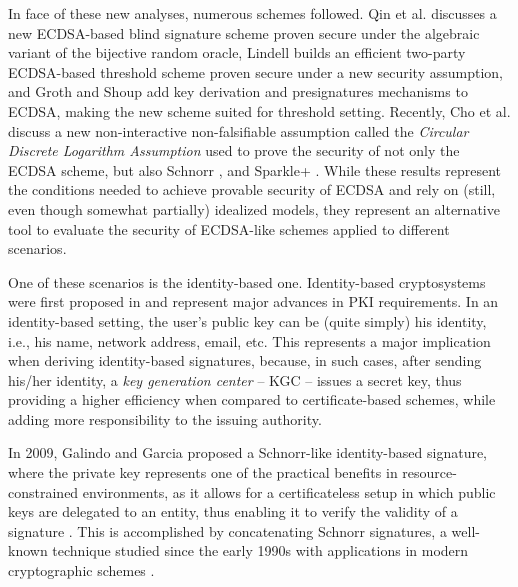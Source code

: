 \documentclass[version=submission, floatrow]{iacrcc}
\begin{document}
In face of these new analyses, numerous schemes followed.
%
Qin et al. \cite{Qin2021} discusses a new ECDSA-based blind signature scheme proven secure under the algebraic variant of the bijective random oracle, Lindell \cite{Lindell2021} builds an efficient two-party ECDSA-based threshold scheme proven secure under a new security assumption, and Groth and Shoup \cite{Groth2022} add key derivation and presignatures mechanisms to ECDSA, making the new scheme suited for threshold setting.
%
Recently, Cho et al. \cite{Fuchsbauer2025} discuss a new non-interactive non-falsifiable assumption called the \emph{Circular Discrete Logarithm Assumption} used to prove the security of not only the ECDSA scheme, but also Schnorr \cite{Schnorr1989}, and \textsf{Sparkle+} \cite{Crites2023}.
%
While these results represent the conditions needed to achieve provable security of ECDSA and rely on (still, even though somewhat partially) idealized models, they represent an alternative tool to evaluate the security of ECDSA-like schemes applied to different scenarios.

One of these scenarios is the identity-based one. Identity-based cryptosystems were first proposed in \cite{Shamir1985} and represent major advances in PKI requirements. 
%
In an identity-based setting, the user's public key can be (quite simply) his identity, i.e., his name, network address, email, etc. 
%
This represents a major implication when deriving identity-based signatures, because, in such cases, after sending his/her identity, a \emph{key generation center} -- KGC -- issues a secret key, thus providing a higher efficiency when compared to certificate-based schemes, while adding more responsibility to the issuing authority.%

In 2009, Galindo and Garcia proposed a Schnorr-like identity-based signature, where the private key represents one of the practical benefits in resource-constrained environments, as it allows for a certificateless setup in which public keys are delegated to an entity, thus enabling it to verify the validity of a signature \cite{Galindo2009}. 
%
This is accomplished by concatenating Schnorr signatures, a well-known technique studied since the early 1990s \cite{Girault91} with applications in modern cryptographic schemes \cite{Maxwell2019}.
\end{document}
